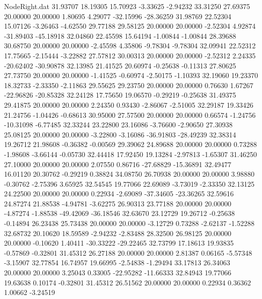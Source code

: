 \begin{filecontents}{NodeRight.dat}
  31.93707   18.19305   15.70923    -3.33625   -2.94232   33.31250   27.69375   20.00000   20.00000    1.80695    4.29077  -32.15996  -28.36259
  31.98769   22.52304   15.07126    -3.26463   -4.62550   29.77188   29.58125   20.00000   20.00000   -2.52304    4.92874  -31.89403  -45.18918
  32.04860   22.45598   15.64194    -1.00844   -1.00844   28.39688   30.68750   20.00000   20.00000   -2.45598    4.35806   -9.78304   -9.78304
  32.09941   22.52312   17.75665    -2.15444   -3.22882   27.57812   30.00313   20.00000   20.00000   -2.52312    2.24335  -20.62402  -30.90878
  32.13985   21.41525   20.60974    -0.25638   -0.11313   27.80625   27.73750   20.00000   20.00000   -1.41525   -0.60974   -2.50175   -1.10393
  32.19060   19.23370   18.32733    -2.33350   -2.11863   29.55625   29.23750   20.00000   20.00000    0.76630    1.67267  -22.96826  -20.85328
  32.24128   17.75650   19.06570    -0.29219   -0.25638   31.49375   29.41875   20.00000   20.00000    2.24350    0.93430   -2.86067   -2.51005
  32.29187   19.33426   21.24756    -1.04426   -0.68613   30.95000   27.57500   20.00000   20.00000    0.66574   -1.24756  -10.31098   -6.77485
  32.33244   23.22800   23.16086    -3.76600   -2.90650   27.30938   25.08125   20.00000   20.00000   -3.22800   -3.16086  -36.91803  -28.49239
  32.38314   19.26712   21.98608    -0.36382   -0.00569   29.39062   24.89688   20.00000   20.00000    0.73288   -1.98608   -3.66144   -0.05730
  32.44418   17.92450   19.13284    -2.97813   -1.65307   31.46250   27.10000   20.00000   20.00000    2.07550    0.86716  -27.68829  -15.36891
  32.49477   16.01120   20.30762    -0.29219    0.38824   34.08750   26.70938   20.00000   20.00000    3.98880   -0.30762   -2.75396    3.65925
  32.54545   19.77066   22.69089    -3.73019   -2.33350   32.13125   24.22500   20.00000   20.00000    0.22934   -2.69089  -37.34605  -23.36265
  32.59616   24.87274   21.88538    -4.94781   -3.62275   26.90313   23.77188   20.00000   20.00000   -4.87274   -1.88538  -49.42069  -36.18546
  32.63670   23.12729   19.26712    -0.25638   -0.14894   26.23438   25.73438   20.00000   20.00000   -3.12729    0.73288   -2.62137   -1.52288
  32.68732   20.10620   18.59589    -2.94232   -2.83488   28.32500   26.98125   20.00000   20.00000   -0.10620    1.40411  -30.33222  -29.22465
  32.73799   17.18613   19.93835    -0.57869   -0.32801   31.45312   26.27188   20.00000   20.00000    2.81387    0.06165   -5.57348   -3.15907
  32.77854   16.74957   19.66995    -2.54838   -1.29494   33.17813   26.34063   20.00000   20.00000    3.25043    0.33005  -22.95282  -11.66333
  32.84943   19.77066   19.63638     0.10174   -0.32801   31.45312   26.51562   20.00000   20.00000    0.22934    0.36362    1.00662   -3.24519

\end{filecontents}
